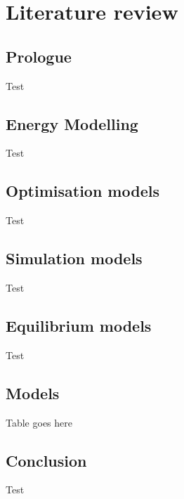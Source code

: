 \chapter{Literature review}

\ifpdf
    \graphicspath{{Chapter3/Figs/Raster/}{Chapter3/Figs/PDF/}{Chapter3/Figs/}}
\else
    \graphicspath{{Chapter3/Figs/Vector/}{Chapter3/Figs/}}
\fi

\section{Prologue}

Test

\section{Energy Modelling}

Test

\section{Optimisation models}

Test

\section{Simulation models}

Test

\section{Equilibrium models}

Test

\section{Models}

Table goes here

\section{Conclusion}

Test